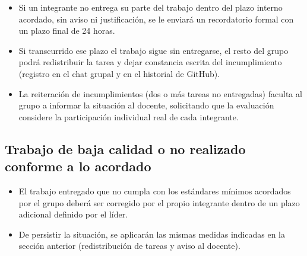 \begin{itemize}[label=--]
    \item Si un integrante no entrega su parte del trabajo dentro del plazo interno acordado, sin aviso ni justificación, se le enviará un recordatorio formal con un plazo final de 24 horas.
    \item Si transcurrido ese plazo el trabajo sigue sin entregarse, el resto del grupo podrá redistribuir la tarea y dejar constancia escrita del incumplimiento (registro en el chat grupal y en el historial de GitHub).
    \item La reiteración de incumplimientos (dos o más tareas no entregadas) faculta al grupo a informar la situación al docente, solicitando que la evaluación considere la participación individual real de cada integrante.
\end{itemize}

\subsection{Trabajo de baja calidad o no realizado conforme a lo acordado}

\begin{itemize}[label=--]
    \item El trabajo entregado que no cumpla con los estándares mínimos acordados por el grupo deberá ser corregido por el propio integrante dentro de un plazo adicional definido por el líder.
    \item De persistir la situación, se aplicarán las mismas medidas indicadas en la sección anterior (redistribución de tareas y aviso al docente).
\end{itemize}

